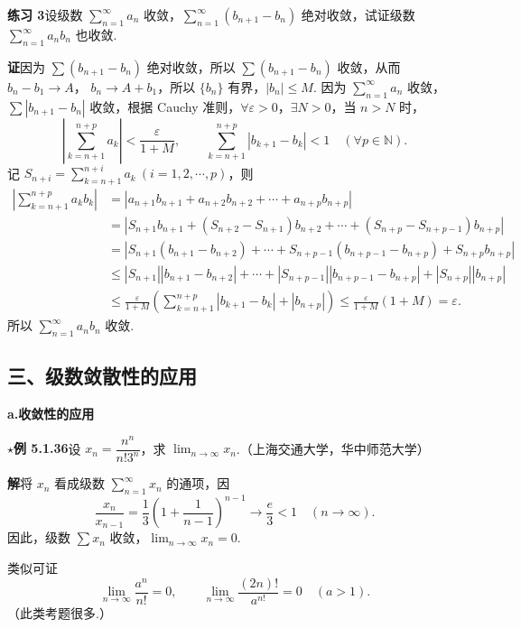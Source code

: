 \documentclass[UTF8,12pt,a4paper,fontset=fandol]{ctexart}
\begin{document}
\noindent\textbf{练习 3}\quad 设级数 $\displaystyle\sum_{n=1}^{\infty}a_n$ 收敛，$\displaystyle\sum_{n=1}^{\infty}(b_{n+1}-b_n)$ 绝对收敛，试证级数
$\displaystyle\sum_{n=1}^{\infty}a_nb_n$ 也收敛.

\noindent\textbf{证}\quad 因为 $\displaystyle\sum(b_{n+1}-b_n)$ 绝对收敛，所以
$\displaystyle\sum(b_{n+1}-b_n)$ 收敛，从而 $b_n-b_1\to A$，
$b_n\to A+b_1$，所以 $\{b_n\}$ 有界，$|b_n|\le M$. 因为
$\displaystyle\sum_{n=1}^{\infty}a_n$ 收敛，$\displaystyle\sum|b_{n+1}-b_n|$ 收敛，根据 Cauchy 准则，$\forall\varepsilon>0$，$\exists N>0$，当 $n>N$ 时，
\[
  \left|\sum_{k=n+1}^{n+p}a_k\right|<\frac{\varepsilon}{1+M},
  \qquad
  \sum_{k=n+1}^{n+p}|b_{k+1}-b_k|<1\quad(\forall p\in\mathbb N).
\]
记 $S_{n+i}=\displaystyle\sum_{k=n+1}^{n+i}a_k\ (i=1,2,\cdots,p)$，则
\[
\begin{aligned}
  \left|\sum_{k=n+1}^{n+p}a_kb_k\right|
  &=|a_{n+1}b_{n+1}+a_{n+2}b_{n+2}+\cdots+a_{n+p}b_{n+p}|\\
  &=|S_{n+1}b_{n+1}+(S_{n+2}-S_{n+1})b_{n+2}
     +\cdots+(S_{n+p}-S_{n+p-1})b_{n+p}|\\
  &=|S_{n+1}(b_{n+1}-b_{n+2})+\cdots
    +S_{n+p-1}(b_{n+p-1}-b_{n+p})+S_{n+p}b_{n+p}|\\
  &\le |S_{n+1}||b_{n+1}-b_{n+2}|+\cdots
    +|S_{n+p-1}||b_{n+p-1}-b_{n+p}|+|S_{n+p}||b_{n+p}|\\
  &\le \frac{\varepsilon}{1+M}
    \left(\sum_{k=n+1}^{n+p}|b_{k+1}-b_k|+|b_{n+p}|\right)
  \le\frac{\varepsilon}{1+M}(1+M)=\varepsilon.
\end{aligned}
\]
所以 $\displaystyle\sum_{n=1}^{\infty}a_nb_n$ 收敛.

\subsection*{三、级数敛散性的应用}

\noindent\textbf{a.\quad 收敛性的应用}

\noindent\textbf{$\star$例 5.1.36}\quad 设
$x_n=\dfrac{n^n}{n!3^n}$，求 $\displaystyle\lim_{n\to\infty}x_n$.（上海交通大学，华中师范大学）

\noindent\textbf{解}\quad 将 $x_n$ 看成级数 $\displaystyle\sum_{n=1}^{\infty}x_n$ 的通项，因
\[
  \frac{x_n}{x_{n-1}}=\frac13\left(1+\frac1{n-1}\right)^{n-1}
  \to\frac e3<1\quad(n\to\infty).
\]
因此，级数 $\sum x_n$ 收敛，$\displaystyle\lim_{n\to\infty}x_n=0$.

类似可证
\[
  \lim_{n\to\infty}\frac{a^n}{n!}=0,\qquad
  \lim_{n\to\infty}\frac{(2n)!}{a^{n!}}=0\quad(a>1).
\]
（此类考题很多.）
\end{document}

